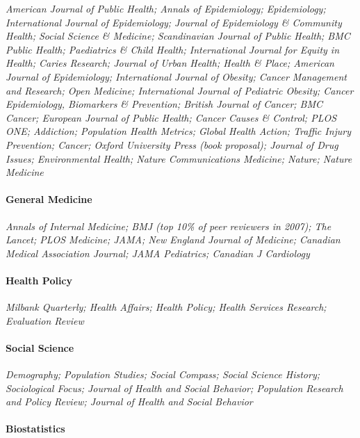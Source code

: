 \documentclass[
  letterpaper,
  DIV=11,
  numbers=noendperiod]{scrartcl}
\let\oldparagraph\paragraph
\renewcommand{\paragraph}[1]{\oldparagraph{#1}\mbox{}}
\begin{document}
\emph{American Journal of Public Health; Annals of Epidemiology;
Epidemiology; International Journal of Epidemiology; Journal of
Epidemiology \& Community Health; Social Science \& Medicine;
Scandinavian Journal of Public Health; BMC Public Health; Paediatrics \&
Child Health; International Journal for Equity in Health; Caries
Research; Journal of Urban Health; Health \& Place; American Journal of
Epidemiology; International Journal of Obesity; Cancer Management and
Research; Open Medicine; International Journal of Pediatric Obesity;
Cancer Epidemiology, Biomarkers \& Prevention; British Journal of
Cancer; BMC Cancer; European Journal of Public Health; Cancer Causes \&
Control; PLOS ONE; Addiction; Population Health Metrics; Global Health
Action; Traffic Injury Prevention; Cancer; Oxford University Press (book
proposal); Journal of Drug Issues; Environmental Health; Nature
Communications Medicine; Nature; Nature Medicine }

\hypertarget{general-medicine}{%
\paragraph{General Medicine}\label{general-medicine}}

\emph{Annals of Internal Medicine; BMJ (top 10\% of peer reviewers in
2007); The Lancet; PLOS Medicine; JAMA; New England Journal of Medicine;
Canadian Medical Association Journal; JAMA Pediatrics; Canadian J
Cardiology}

\hypertarget{health-policy}{%
\paragraph{Health Policy}\label{health-policy}}

\emph{Milbank Quarterly; Health Affairs; Health Policy; Health Services
Research; Evaluation Review}

\hypertarget{social-science}{%
\paragraph{Social Science}\label{social-science}}

\emph{Demography; Population Studies; Social Compass; Social Science
History; Sociological Focus; Journal of Health and Social Behavior;
Population Research and Policy Review; Journal of Health and Social
Behavior}

\hypertarget{biostatistics}{%
\paragraph{Biostatistics}\label{biostatistics}}
\end{document}

